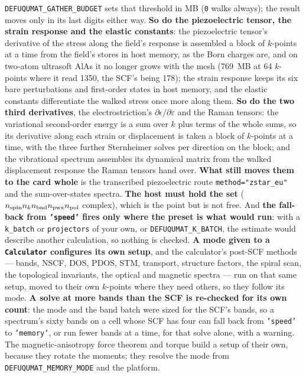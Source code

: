 \documentclass[11pt,a4paper]{article}
\newcommand{\code}[1]{\texttt{\small #1}}
\begin{document}
\begin{refuses}
\code{DEFUQUMAT\_GATHER\_BUDGET} sets that threshold in MB (\code{0} walks
always); the result moves only in its last digits either way. \textbf{So do the
piezoelectric tensor, the strain response and the elastic constants}: the
piezoelectric tensor's derivative of the stress along the field's response is
assembled a block of $k$-points at a time from the field's stores in host
memory, as the Born charges are, and on two-atom ultrasoft AlAs it no longer
grows with the mesh (769~MB at 64 $k$-points where it read 1350, the SCF's
being 178); the strain response keeps its six bare perturbations and
first-order states in host memory, and the elastic constants differentiate the
walked stress once more along them. \textbf{So do the two third derivatives},
the electrostriction's $\partial\epsilon/\partial\varepsilon$ and the Raman
tensors: the variational second-order energy is a sum over $k$ plus terms of the
whole sums, so its derivative along each strain or displacement is taken a
block of $k$-points at a time, with the three further Sternheimer solves per
direction on the block; and the vibrational spectrum assembles its dynamical
matrix from the walked displacement response the Raman tensors hand over.
\textbf{What still moves them to the card whole} is the transcribed
piezoelectric route \code{method="zstar\_eu"} and the sum-over-states spectra. \textbf{The host
must hold the set} ($n_{\rm spin} n_k n_{\rm bnd} n_{\rm pwx} n_{\rm pol}$
complex), which is the point but is not free. And \textbf{the fall-back from
\code{'speed'} fires only where the preset is what would run}: with a
\code{k\_batch} or \code{projectors} of your own, or \code{DEFUQUMAT\_K\_BATCH},
the estimate would describe another calculation, so nothing is checked.
\textbf{A mode given to a \code{Calculator} configures its own setup}, and the
calculator's post-SCF methods --- bands, NSCF, DOS, PDOS, STM, transport,
structure factors, the spiral scan, the topological invariants, the optical and
magnetic spectra --- run on that same setup, moved to their own $k$-points where
they need others, so they follow its mode. \textbf{A solve at more bands than the
SCF is re-checked for its own count}: the mode and the band batch were sized for
the SCF's bands, so a spectrum's sixty bands on a cell whose SCF has four can
fall back from \code{'speed'} to \code{'memory'}, or run fewer bands at a time,
for that solve alone, with a warning. The magnetic-anisotropy force theorem and torque build a setup of
their own, because they rotate the moments; they resolve the mode from
\code{DEFUQUMAT\_MEMORY\_MODE} and the platform.
\end{refuses}
\end{document}
